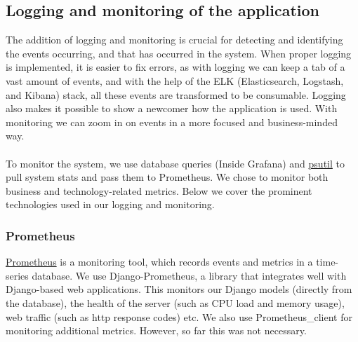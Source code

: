 \documentclass[11pt]{article}
\begin{document}
\subsection{Logging and monitoring of the application}
The addition of logging and monitoring is crucial for detecting and identifying the events occurring, and that has occurred in the system. When proper logging is implemented, it is easier to fix errors, as with logging we can keep a tab of a vast amount of events, and with the help of the ELK (Elasticsearch, Logstash, and Kibana) stack, all these events are transformed to be consumable. Logging also makes it possible to show a newcomer how the application is used. With monitoring we can zoom in on events in a more focused and business-minded way.
\\\\
To monitor the system, we use database queries (Inside Grafana) and \href{https://github.com/giampaolo/psutil}{psutil} to pull system stats and pass them to Prometheus. We chose to monitor both business and technology-related metrics. Below we cover the prominent technologies used in our logging and monitoring.

\subsubsection{Prometheus}
\href{https://Prometheus.io/}{Prometheus} is a monitoring tool, which records events and metrics in a time-series database. We use Django-Prometheus, a library that integrates well with Django-based web applications. This monitors our Django models (directly from the database), the health of the server (such as CPU load and memory usage), web traffic (such as http response codes) etc. We also use Prometheus\_client for monitoring additional metrics. However, so far this was not necessary. 
\end{document}

